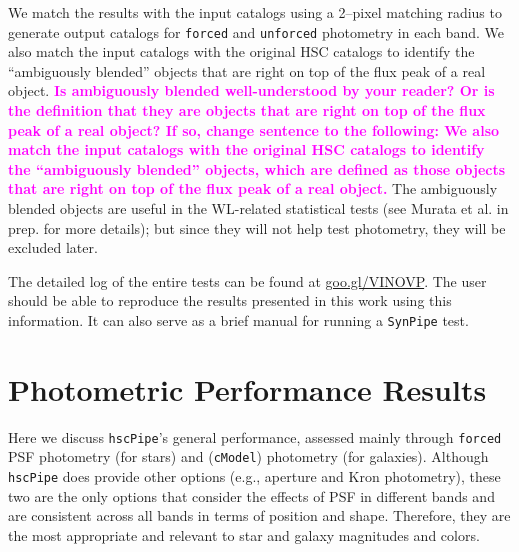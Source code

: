 \documentclass[useamsfonts]{pasj01}
\def\hscpipe{\texttt{hscPipe}}
\def\synpipe{\texttt{SynPipe}}
\def\cmodel{\texttt{cModel}}
\def\forced{\texttt{forced}}
\def\unforced{\texttt{unforced}}
\newcommand{\susan}[1]{\textcolor{magenta} {\textbf{#1}}}
\begin{document}
    We match the results with the input catalogs using a 2--pixel matching radius
    to generate output catalogs for \forced{} and \unforced{} photometry
    in each band.
    We also match the input catalogs with the original HSC catalogs to identify the
    ``ambiguously blended'' objects that are right on top of the flux peak of a real
    object. \susan{Is ambiguously blended well-understood by your reader? Or is the definition that they are objects that are right on top of the flux peak of a real object? If so, change sentence to the following: We also match the input catalogs with the original HSC catalogs to identify the  ``ambiguously blended'' objects, which are defined as those objects that are right on top of the flux peak of a real
    object.}
    The ambiguously blended objects are useful in the WL-related statistical tests (see Murata et al.
    in prep. for more details); but since they will not help test photometry, they will be excluded later.

    The detailed log of the entire tests can be found at 
    \url{goo.gl/VINOVP}.
    The user should be able to reproduce the results presented in this work using this information. It can also serve as a brief manual for running a \synpipe{} test.


\section{Photometric Performance Results}
    \label{sec:result}

    Here we discuss \hscpipe{}'s general performance, assessed mainly through  \forced{} PSF photometry (for stars) and (\cmodel{}) photometry (for galaxies).
 Although  \hscpipe{} does provide other options (e.g., aperture and Kron photometry), 
these two are the only options that consider the effects of PSF in different bands and are consistent across all bands in terms of position and shape. Therefore, they are the most appropriate and relevant to star and galaxy magnitudes and colors.

\end{document}
